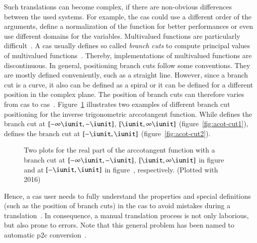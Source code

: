 Such translations can become complex, if there are non-obvious differences between the used systems. For example, the \gls{cas} could use a different order of the arguments, define a normalization of the function for better performances or even use different domains for the variables. Multivalued functions are particularly difficult~\cite{AISC:MultivaluedFunctions}. A \gls{cas} usually defines so called \textit{branch cuts} to compute principal values of multivalued functions~\cite{Maple:Cuts}. Thereby, implementations of multivalued functions are discontinuous. In general, positioning branch cuts follow some conventions. They are mostly defined conveniently, such as a straight line. However, since a branch cut is a curve, it also can be defined as a spiral or it can be defined for a different position in the complex plane. The position of branch cuts can therefore varies from \gls{cas} to \gls{cas}~\cite{Branches:acot}. Figure~\ref{fig:acot-cut-compare} illustrates two examples of different branch cut positioning for the inverse trigonometric arccotangent function. While \Maple{} defines the branch cut at ${[-\infty\iunit, -\iunit]}$, ${[\iunit,\infty\iunit]}$ (figure~\ref{fig:acot-cut1}), \Mathematica{} defines the branch cut at ${[-\iunit, \iunit]}$ (figure~\ref{fig:acot-cut2}).

\begin{figure}[ht]
    \centering
    \hspace{0.5cm}
    \caption{Two plots for the real part of the arccotangent function with a branch cut at $[-\infty\iunit, -\iunit]$, $[\iunit,\infty\iunit]$ in figure~\protect{} and at $[-\iunit, \iunit]$ in figure~\protect{}, respectively. (Plotted with \Maple{} 2016)}
    \label{fig:acot-cut-compare}
\end{figure}

Hence, a \gls{cas} user needs to fully understand the properties and special definitions (such as the position of branch cuts) in the \gls{cas} to avoid mistakes during a translation~\cite{Maple:Cuts}. In consequence, a manual translation process is not only laborious, but also prone to errors. Note that this general problem has been named to automatic \gls{p2c} conversion~\cite{POM-Tagger}.

